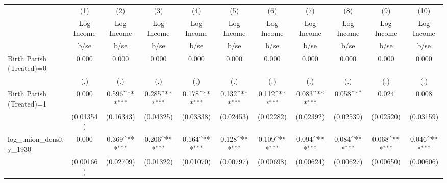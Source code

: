 {
\def\sym#1{\ifmmode^{#1}\else\(^{#1}\)\fi}
\begin{tabular}{l*{10}{c}}
\hline\hline
                    &\multicolumn{1}{c}{(1)}&\multicolumn{1}{c}{(2)}&\multicolumn{1}{c}{(3)}&\multicolumn{1}{c}{(4)}&\multicolumn{1}{c}{(5)}&\multicolumn{1}{c}{(6)}&\multicolumn{1}{c}{(7)}&\multicolumn{1}{c}{(8)}&\multicolumn{1}{c}{(9)}&\multicolumn{1}{c}{(10)}\\
                    &\multicolumn{1}{c}{Log Income}&\multicolumn{1}{c}{Log Income}&\multicolumn{1}{c}{Log Income}&\multicolumn{1}{c}{Log Income}&\multicolumn{1}{c}{Log Income}&\multicolumn{1}{c}{Log Income}&\multicolumn{1}{c}{Log Income}&\multicolumn{1}{c}{Log Income}&\multicolumn{1}{c}{Log Income}&\multicolumn{1}{c}{Log Income}\\
                    &        b/se         &        b/se         &        b/se         &        b/se         &        b/se         &        b/se         &        b/se         &        b/se         &        b/se         &        b/se         \\
\hline
Birth Parish (Treated)=0&       0.000         &       0.000         &       0.000         &       0.000         &       0.000         &       0.000         &       0.000         &       0.000         &       0.000         &       0.000         \\
                    &         (.)         &         (.)         &         (.)         &         (.)         &         (.)         &         (.)         &         (.)         &         (.)         &         (.)         &         (.)         \\
Birth Parish (Treated)=1&       0.000         &       0.596\sym{***}&       0.285\sym{***}&       0.178\sym{***}&       0.132\sym{***}&       0.112\sym{***}&       0.083\sym{***}&       0.058\sym{*}  &       0.024         &       0.008         \\
                    &   (0.01354)         &   (0.16343)         &   (0.04325)         &   (0.03338)         &   (0.02453)         &   (0.02282)         &   (0.02392)         &   (0.02539)         &   (0.02520)         &   (0.03159)         \\
log\_union\_density\_1930&       0.000         &       0.369\sym{***}&       0.206\sym{***}&       0.164\sym{***}&       0.128\sym{***}&       0.109\sym{***}&       0.094\sym{***}&       0.084\sym{***}&       0.068\sym{***}&       0.046\sym{***}\\
                    &   (0.00166)         &   (0.02709)         &   (0.01322)         &   (0.01070)         &   (0.00797)         &   (0.00698)         &   (0.00624)         &   (0.00627)         &   (0.00650)         &   (0.00606)         \\

\end{tabular}}
